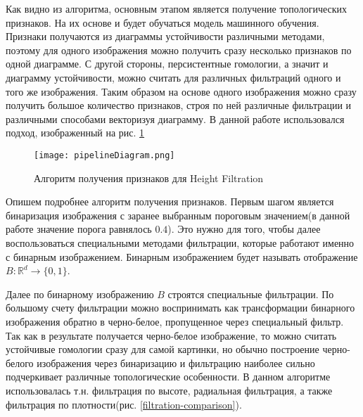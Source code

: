 Как видно из алгоритма, основным этапом является получение топологических признаков. На их основе и будет обучаться модель машинного обучения. Признаки получаются из диаграммы устойчивости различными методами, поэтому для одного изображения можно получить сразу несколько признаков по одной диаграмме. С другой стороны, персистентные гомологии, а значит и диаграмму устойчивости, можно считать для различных фильтраций одного и того же изображения. Таким образом на основе одного изображения можно сразу получить большое количество признаков, строя по ней различные фильтрации и различными способами векторизуя диаграмму. В данной работе использовался подход, изображенный на рис. \ref{pipeline}

\begin{figure}[!htbp]
	\begin{center}
		\texttt{[image: pipelineDiagram.png]}\\
		\caption{Алгоритм получения признаков для Height Filtration}
		\label{pipeline}
	\end{center}
\end{figure}

Опишем подробнее алгоритм получения признаков. Первым шагом является бинаризация изображения с заранее выбранным пороговым значением(в данной работе значение порога равнялось $0.4$). Это нужно для того, чтобы далее воспользоваться специальными методами фильтрации, которые работают именно с бинарным изображением. Бинарным изображением будет называть отображение $B: \mathbb{R}^d \to \{0, 1\}$.

Далее по бинарному изображению $B$ строятся специальные фильтрации. По большому счету фильтрации можно воспринимать как трансформации бинарного изображения обратно в черно-белое, пропущенное через специальный фильтр. Так как в результате получается черно-белое изображение, то можно считать устойчивые гомологии сразу для самой картинки, но обычно построение черно-белого изображения через бинаризацию и фильтрацию наиболее сильно подчеркивает различные топологические особенности. В данном алгоритме использовалась т.н. фильтрация по высоте, радиальная фильтрация, а также фильтрация по плотности(рис. \ref{filtration-comparison}). 

